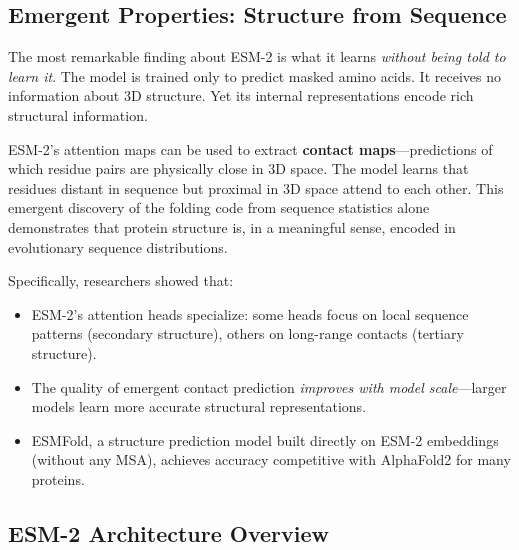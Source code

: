 \subsection{Emergent Properties: Structure from Sequence}

The most remarkable finding about ESM-2 is what it learns \emph{without being told to learn it}. The model is trained only to predict masked amino acids. It receives no information about 3D structure. Yet its internal representations encode rich structural information.

\begin{bioinsight}
ESM-2's attention maps can be used to extract \textbf{contact maps}---predictions of which residue pairs are physically close in 3D space. The model learns that residues distant in sequence but proximal in 3D space attend to each other. This emergent discovery of the folding code from sequence statistics alone demonstrates that protein structure is, in a meaningful sense, encoded in evolutionary sequence distributions.
\end{bioinsight}

Specifically, researchers showed that:
\begin{itemize}[leftmargin=1.5em]
  \item ESM-2's attention heads specialize: some heads focus on local sequence patterns (secondary structure), others on long-range contacts (tertiary structure).
  \item The quality of emergent contact prediction \emph{improves with model scale}---larger models learn more accurate structural representations.
  \item ESMFold, a structure prediction model built directly on ESM-2 embeddings (without any MSA), achieves accuracy competitive with AlphaFold2 for many proteins.
\end{itemize}

\subsection{ESM-2 Architecture Overview}

